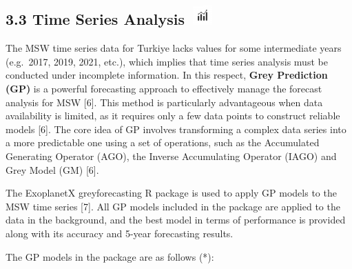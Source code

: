\documentclass[
  11pt,
  a4paper,
  DIV=11,
  numbers=noendperiod]{scrartcl}
\begin{document}
\subsection[{3.3 Time Series Analysis} ]{\texorpdfstring{{3.3 Time
Series Analysis}
\protect\includegraphics[width=0.375in,height=0.29167in]{assets/images/model.jpg}}{3.3 Time Series Analysis }}\label{time-series-analysis}

The MSW time series data for Turkiye lacks values for some intermediate
years (e.g.~2017, 2019, 2021, etc.), which implies that time series
analysis must be conducted under incomplete information. In this
respect, \textbf{Grey Prediction (GP)} is a powerful forecasting
approach to effectively manage the forecast analysis for MSW {[}6{]}.
This method is particularly advantageous when data availability is
limited, as it requires only a few data points to construct reliable
models {[}6{]}. The core idea of GP involves transforming a complex data
series into a more predictable one using a set of operations, such as
the Accumulated Generating Operator (AGO), the Inverse Accumulating
Operator (IAGO) and Grey Model (GM) {[}6{]}.

The ExoplanetX greyforecasting R package is used to apply GP models to
the MSW time series {[}7{]}. All GP models included in the package are
applied to the data in the background, and the best model in terms of
performance is provided along with its accuracy and 5-year forecasting
results.

The GP models in the package are as follows (*):
\end{document}
